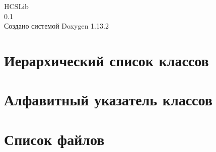 \documentclass[twoside]{book}
\newcommand{\+}{\discretionary{\mbox{\scriptsize$\hookleftarrow$}}{}{}}
\newcommand{\clearemptydoublepage}{%
    \newpage{\pagestyle{empty}\cleardoublepage}%
  }
\begin{document}
  \raggedbottom
    \hypersetup{pageanchor=false,
                bookmarksnumbered=true,
                pdfencoding=unicode
               }
  \begin{titlepage}
  \vspace*{7cm}
  \begin{center}%
  {\Large HCSLib}\\
  [1ex]\large 0.\+1 \\
  \vspace*{1cm}
  {\large Создано системой Doxygen 1.13.2}\\
  \end{center}
  \end{titlepage}
  \clearemptydoublepage
  \tableofcontents
  \clearemptydoublepage
  \hypersetup{pageanchor=true}
\chapter{Иерархический список классов}

\chapter{Алфавитный указатель классов}

\chapter{Список файлов}

\end{document}
